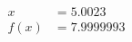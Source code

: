 \documentclass[preview]{standalone}
\begin{document}
\begin{align*}
x &= 5.0023\\f(x) &= 7.9999993
\end{align*}
\end{document}
